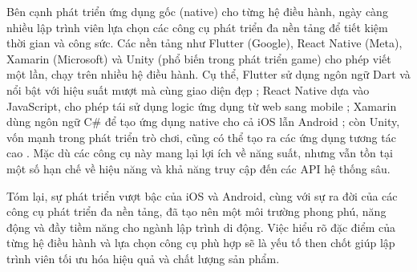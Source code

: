       \vspace{0.5em}
    
      \hspace*{0.8cm}Bên cạnh phát triển ứng dụng gốc (native) cho từng hệ điều hành, ngày càng nhiều lập trình viên lựa chọn các công cụ phát triển đa nền tảng để tiết kiệm thời gian và công sức. Các nền tảng như Flutter (Google), React Native (Meta), Xamarin (Microsoft) và Unity (phổ biến trong phát triển game) cho phép viết một lần, chạy trên nhiều hệ điều hành. Cụ thể, Flutter sử dụng ngôn ngữ Dart và nổi bật với hiệu suất mượt mà cùng giao diện đẹp \cite{flutter}; React Native dựa vào JavaScript, cho phép tái sử dụng logic ứng dụng từ web sang mobile \cite{reactnative}; Xamarin dùng ngôn ngữ C\# để tạo ứng dụng native cho cả iOS lẫn Android \cite{xamarin}; còn Unity, vốn mạnh trong phát triển trò chơi, cũng có thể tạo ra các ứng dụng tương tác cao \cite{unity}. Mặc dù các công cụ này mang lại lợi ích về năng suất, nhưng vẫn tồn tại một số hạn chế về hiệu năng và khả năng truy cập đến các API hệ thống sâu.
    
      \vspace{0.5em}
    
      \hspace*{0.8cm}Tóm lại, sự phát triển vượt bậc của iOS và Android, cùng với sự ra đời của các công cụ phát triển đa nền tảng, đã tạo nên một môi trường phong phú, năng động và đầy tiềm năng cho ngành lập trình di động. Việc hiểu rõ đặc điểm của từng hệ điều hành và lựa chọn công cụ phù hợp sẽ là yếu tố then chốt giúp lập trình viên tối ưu hóa hiệu quả và chất lượng sản phẩm.
    